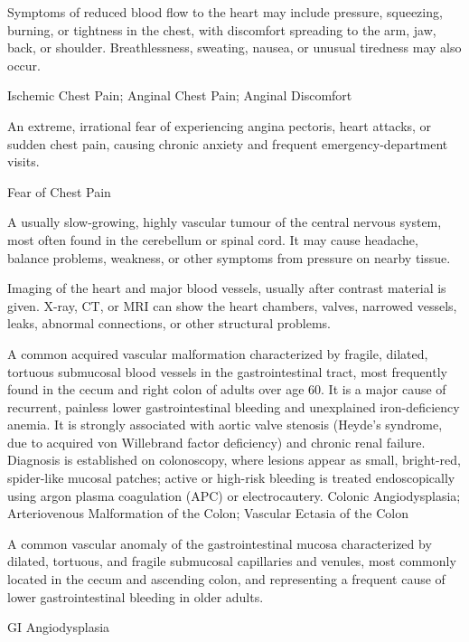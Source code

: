  Symptoms of reduced blood flow to the heart may include pressure, squeezing, burning, or tightness in the chest, with discomfort spreading to the arm, jaw, back, or shoulder. Breathlessness, sweating, nausea, or unusual tiredness may also occur.

\synonyms
Ischemic Chest Pain; Anginal Chest Pain; Anginal Discomfort

 An extreme, irrational fear of experiencing angina pectoris, heart attacks, or sudden chest pain, causing chronic anxiety and frequent emergency-department visits.

\synonyms
Fear of Chest Pain

 A usually slow-growing, highly vascular tumour of the central nervous system, most often found in the cerebellum or spinal cord. It may cause headache, balance problems, weakness, or other symptoms from pressure on nearby tissue.

 Imaging of the heart and major blood vessels, usually after contrast material is given. X-ray, CT, or MRI can show the heart chambers, valves, narrowed vessels, leaks, abnormal connections, or other structural problems.

 A common acquired vascular malformation characterized by fragile, dilated, tortuous submucosal blood vessels in the gastrointestinal tract, most frequently found in the cecum and right colon of adults over age 60. It is a major cause of recurrent, painless lower gastrointestinal bleeding and unexplained iron-deficiency anemia. It is strongly associated with aortic valve stenosis (Heyde's syndrome, due to acquired von Willebrand factor deficiency) and chronic renal failure. Diagnosis is established on colonoscopy, where lesions appear as small, bright-red, spider-like mucosal patches; active or high-risk bleeding is treated endoscopically using argon plasma coagulation (APC) or electrocautery.
\synonyms
Colonic Angiodysplasia; Arteriovenous Malformation of the Colon; Vascular Ectasia of the Colon

 A common vascular anomaly of the gastrointestinal mucosa characterized by dilated, tortuous, and fragile submucosal capillaries and venules, most commonly located in the cecum and ascending colon, and representing a frequent cause of lower gastrointestinal bleeding in older adults.

\synonyms
GI Angiodysplasia

